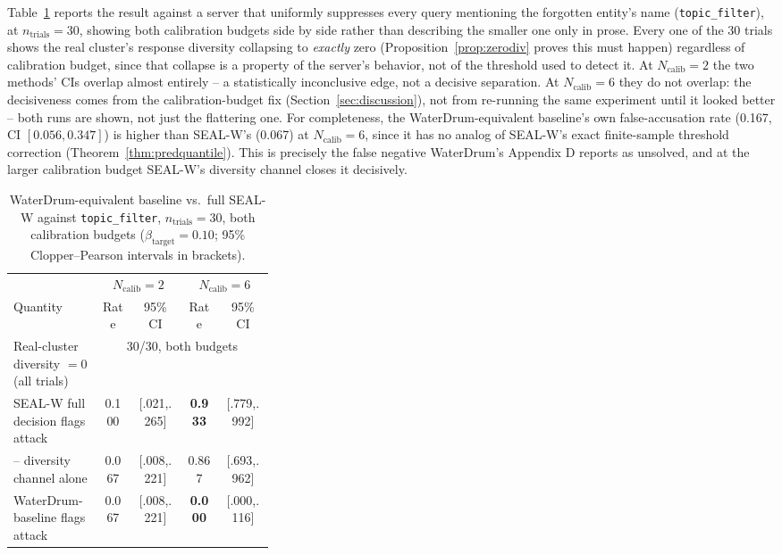 \documentclass[10pt,journal,compsoc]{IEEEtran}
\begin{document}
Table~\ref{tab:waterdrum} reports the result against a server that uniformly suppresses every query mentioning the forgotten entity's name (\texttt{topic\_filter}), at $n_{\text{trials}}=30$, showing both calibration budgets side by side rather than describing the smaller one only in prose. Every one of the 30 trials shows the real cluster's response diversity collapsing to \emph{exactly} zero (Proposition~\ref{prop:zerodiv} proves this must happen) regardless of calibration budget, since that collapse is a property of the server's behavior, not of the threshold used to detect it. At $N_{\text{calib}}=2$ the two methods' CIs overlap almost entirely -- a statistically inconclusive edge, not a decisive separation. At $N_{\text{calib}}=6$ they do not overlap: the decisiveness comes from the calibration-budget fix (Section~\ref{sec:discussion}), not from re-running the same experiment until it looked better -- both runs are shown, not just the flattering one. For completeness, the WaterDrum-equivalent baseline's own false-accusation rate (0.167, CI $[0.056, 0.347]$) is higher than SEAL-W's (0.067) at $N_{\text{calib}}=6$, since it has no analog of SEAL-W's exact finite-sample threshold correction (Theorem~\ref{thm:predquantile}). This is precisely the false negative WaterDrum's Appendix D reports as unsolved, and at the larger calibration budget SEAL-W's diversity channel closes it decisively.

\begin{table}[t]
\centering
\footnotesize
\caption{WaterDrum-equivalent baseline vs.\ full SEAL-W against \texttt{topic\_filter}, $n_{\text{trials}}=30$, both calibration budgets ($\beta_{\text{target}}=0.10$; 95\% Clopper--Pearson intervals in brackets).}
\label{tab:waterdrum}
\begin{tabular}{@{}p{0.34\linewidth}cccc@{}}
\toprule
& \multicolumn{2}{c}{$N_{\text{calib}}{=}2$} & \multicolumn{2}{c}{$N_{\text{calib}}{=}6$} \\
Quantity & Rate & 95\% CI & Rate & 95\% CI \\
\midrule
Real-cluster diversity $=0$ (all trials) & \multicolumn{4}{c}{30/30, both budgets} \\
SEAL-W full decision flags attack & 0.100 & [.021,.265] & \textbf{0.933} & [.779,.992] \\
\quad -- diversity channel alone & 0.067 & [.008,.221] & 0.867 & [.693,.962] \\
WaterDrum-baseline flags attack & 0.067 & [.008,.221] & \textbf{0.000} & [.000,.116] \\
\bottomrule
\end{tabular}
\end{table}
\end{document}

